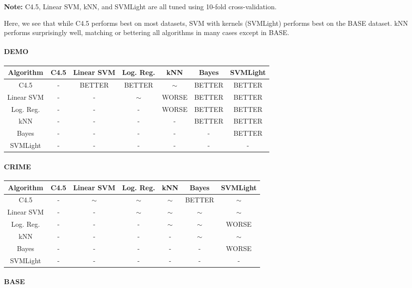 \documentclass[11pt,letter]{article}
\begin{document}
\textbf{Note:} C4.5, Linear SVM, kNN, and SVMLight are all tuned using 10-fold cross-validation.

Here, we see that while C4.5 performs best on most datasets, SVM with kernels (SVMLight) performs best on the BASE dataset. kNN performs surprisingly well, matching or bettering all algorithms in many cases except in BASE.

\paragraph{DEMO} \quad

\begin{tabular}{|c|c|c|c|c|c|c|}
\hline
Algorithm & C4.5  & Linear SVM & Log. Reg.  & kNN  & Bayes & SVMLight \\
\hline
C4.5 	& -		& BETTER	& BETTER	& $\sim$	& BETTER	& BETTER	\\
Linear SVM		& -		& -			& $\sim$	& WORSE		& BETTER	& BETTER	\\
Log. Reg. 	& -		& -			& -			& WORSE		& BETTER	& BETTER	\\
kNN 		& -		& -			& -			& -			& BETTER	& BETTER	\\
Bayes			& -		& -			& -			& -			& -			& BETTER	\\
SVMLight & - & - & - & - & - & - \\
\hline
\end{tabular}

\paragraph{CRIME} \quad

\begin{tabular}{|c|c|c|c|c|c|c|}
\hline
Algorithm & C4.5  & Linear SVM & Log. Reg. & kNN  & Bayes & SVMLight \\
\hline
C4.5 	& -		& $\sim$	& $\sim$	& $\sim$	& BETTER	& $\sim$	\\
Linear SVM		& -		& -			& $\sim$	& $\sim$	& $\sim$	& $\sim$	\\
Log. Reg. 	& -		& -			& -			& $\sim$	& $\sim$	& WORSE 	\\
kNN 		& -		& -			& -			& -			& $\sim$	& $\sim$	\\
Bayes			& -		& -			& -			& -			& -			& WORSE		\\
SVMLight & - & - & - & - & - & - \\
\hline
\end{tabular}

\paragraph{BASE} \quad
\end{document}
